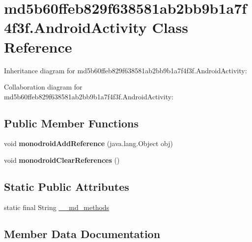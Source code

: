 \hypertarget{classmd5b60ffeb829f638581ab2bb9b1a7f4f3f_1_1_android_activity}{}\section{md5b60ffeb829f638581ab2bb9b1a7f4f3f.\+Android\+Activity Class Reference}
\label{classmd5b60ffeb829f638581ab2bb9b1a7f4f3f_1_1_android_activity}


Inheritance diagram for md5b60ffeb829f638581ab2bb9b1a7f4f3f.\+Android\+Activity\+:


Collaboration diagram for md5b60ffeb829f638581ab2bb9b1a7f4f3f.\+Android\+Activity\+:
\subsection*{Public Member Functions}
\begin{DoxyCompactItemize}
\item 
\mbox{\label{classmd5b60ffeb829f638581ab2bb9b1a7f4f3f_1_1_android_activity_a6b88d0d1ad864a4599f8a26deaacb459}} 
void {\bfseries monodroid\+Add\+Reference} (java.\+lang.\+Object obj)
\item 
\mbox{\label{classmd5b60ffeb829f638581ab2bb9b1a7f4f3f_1_1_android_activity_a5b7d4be6ba547abcf4a46221f65a8eb6}} 
void {\bfseries monodroid\+Clear\+References} ()
\end{DoxyCompactItemize}
\subsection*{Static Public Attributes}
\begin{DoxyCompactItemize}
\item 
static final String \hyperlink{classmd5b60ffeb829f638581ab2bb9b1a7f4f3f_1_1_android_activity_a96cef65bd666995b23bcd03497dea337}{\+\_\+\+\_\+md\+\_\+methods}
\end{DoxyCompactItemize}


\subsection{Member Data Documentation}
\mbox{\label{classmd5b60ffeb829f638581ab2bb9b1a7f4f3f_1_1_android_activity_a96cef65bd666995b23bcd03497dea337}} 
